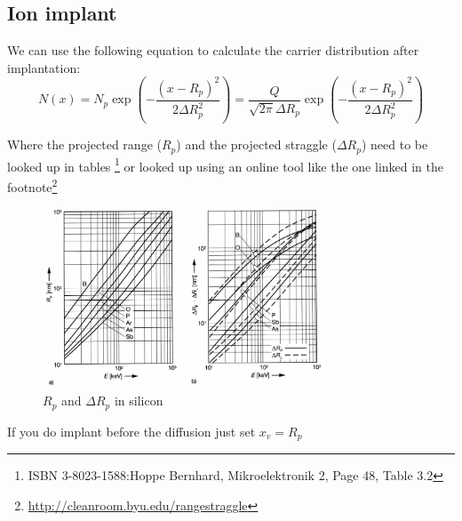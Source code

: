 \subsection{Ion implant}
We can use the following equation to calculate the carrier distribution after implantation:
\begin{equation}
N(x)
=
N_p \exp\left(-\frac{(x-R_p)^2}{2\Delta R_p^2}\right)
=
\frac{Q}{\sqrt{2\pi}\Delta R_p}\exp\left(-\frac{(x-R_p)^2}{2\Delta R_p^2}\right)
\end{equation}

Where the projected range ($R_p$) and the projected straggle ($\Delta R_p$) need to be looked up in tables \footnote{ISBN 3-8023-1588:Hoppe Bernhard, Mikroelektronik 2, Page 48, Table 3.2} or looked up using an online tool like the one linked in the footnote\footnote{\url{http://cleanroom.byu.edu/rangestraggle}}

\begin{figure}[H]
	\centering
	\includegraphics[width=0.75\textwidth]{ion_implant.png}
	\caption{$R_p$ and $\Delta R_p$ in silicon}
	\label{graphics_range_and_straggle}
\end{figure}

\begin{mdframed}[linewidth=2pt,linecolor=red]
If you do implant before the diffusion just set $x_v=R_p$
\end{mdframed}